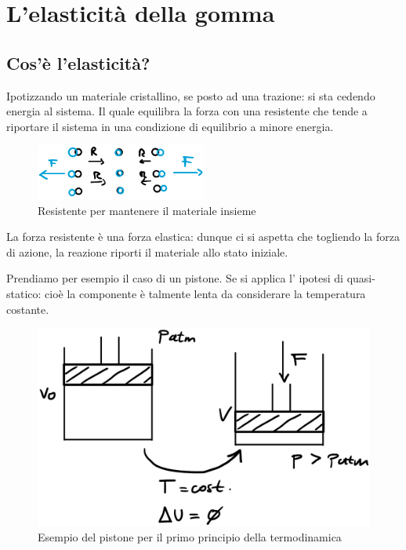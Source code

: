 \chapter{L'elasticità della gomma}\label{chp:ElasticitaGomma}
\section{Cos'è l'elasticità?}
Ipotizzando un materiale cristallino, se posto ad una trazione: si sta cedendo energia al sistema.
Il quale equilibra la forza con una resistente che tende a riportare il sistema in una condizione di equilibrio a minore energia.

\begin{figure}
\centering
\includegraphics[width = 0.5\textwidth]{gfx/Elasticita}
\caption{Resistente per mantenere il materiale insieme}
\label{fig:Elasticita}
\end{figure}

La forza resistente è una forza elastica: dunque ci si aspetta che togliendo la forza di azione, la reazione riporti il materiale allo stato iniziale.

Prendiamo per esempio il caso di un pistone.
Se si applica l' ipotesi di quasi-statico: cioè la componente è talmente lenta da considerare la temperatura costante.

\begin{figure}
\centering
\includegraphics[width = \textwidth]{gfx/1Termodinamica}
\caption{Esempio del pistone per il primo principio della termodinamica}
\label{fig:1Termodinamica}
\end{figure}

